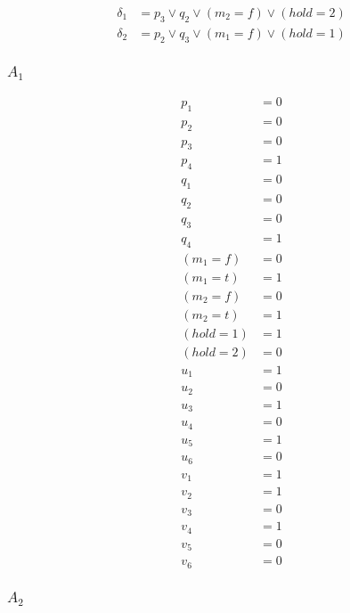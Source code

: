 \documentclass{article}
\begin{document}
\begin{align*}
  \delta_1 &= p_3 \lor q_2 \lor (m_2=f) \lor (hold=2) \\
  \delta_2 &= p_2 \lor q_3 \lor (m_1=f) \lor (hold=1)
\end{align*}

\subsubsection{$A_1$}

\begin{align*}
  p_1 &= 0 \\
  p_2 &= 0 \\
  p_3 &= 0 \\
  p_4 &= 1 \\
  q_1 &= 0 \\
  q_2 &= 0 \\
  q_3 &= 0 \\
  q_4 &= 1 \\
  (m_1=f) &= 0 \\
  (m_1=t) &= 1 \\
  (m_2=f) &= 0 \\
  (m_2=t) &= 1 \\
  (hold=1) &= 1 \\
  (hold=2) &= 0 \\
  u_1 &= 1 \\
  u_2 &= 0 \\
  u_3 &= 1 \\
  u_4 &= 0 \\
  u_5 &= 1 \\
  u_6 &= 0 \\
  v_1 &= 1 \\
  v_2 &= 1 \\
  v_3 &= 0 \\
  v_4 &= 1 \\
  v_5 &= 0 \\
  v_6 &= 0
\end{align*}

\subsubsection{$A_2$}
\end{document}
